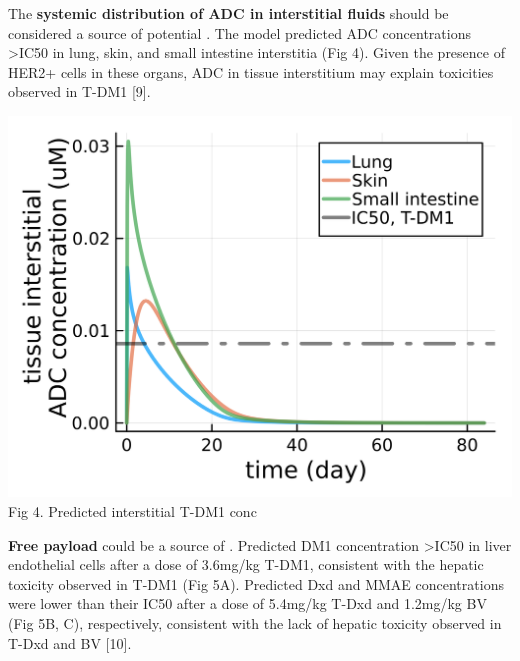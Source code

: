 \documentclass[portrait,fontscale=0.3,paperwidth=36in,paperheight=48in]{baposter}
\begin{document}
\begin{poster}
{\medskip


\begin{minipage}[c]{0.62\linewidth}

The \textbf{systemic distribution of ADC in interstitial fluids} should be considered a source of potential \textbf{\color{metgreen}{on-target off-tumor toxicity}}. 
The model predicted ADC concentrations >IC50 in lung,  skin, and small intestine interstitia (Fig 4). 
Given the presence of HER2+ cells in these organs, ADC in tissue interstitium may explain toxicities observed in T-DM1 [9]. 

\end{minipage}
\hspace{0.1cm}
\begin{minipage}[c]{0.32\linewidth}
\centering
\includegraphics[width= 0.8 \textwidth]{../img/t-dm1-tissue-ints.png} \\
\scriptsize{Fig 4. Predicted interstitial T-DM1 conc}
\end{minipage}

\smallskip

\textbf{Free payload} could be a source of \textbf{\color{metgreen}{off-target toxicity}}. 
Predicted DM1 concentration >IC50 in liver endothelial cells after a dose of 3.6mg/kg T-DM1, consistent with the hepatic toxicity observed in T-DM1 (Fig 5A). 
Predicted Dxd and MMAE concentrations were lower than their IC50 after a dose of 5.4mg/kg T-Dxd and 1.2mg/kg BV (Fig 5B, C), respectively, consistent with the lack of hepatic toxicity observed in T-Dxd and BV [10].

}
\end{poster}
\end{document}
